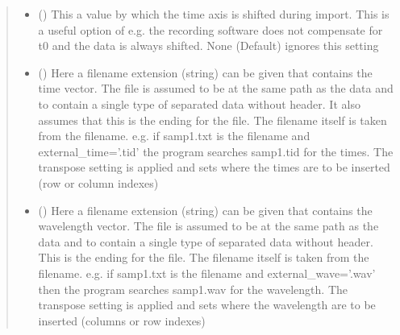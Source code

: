 \documentclass[letterpaper,10pt,english]{sphinxmanual}
\begin{document}
\begin{fulllineitems}
\begin{quote}
\begin{description}
\begin{itemize}
\item {} 
 (\sphinxstyleliteralemphasis{\sphinxupquote{, }}\sphinxstyleliteralemphasis{\sphinxupquote{ (}}\sphinxstyleliteralemphasis{\sphinxupquote{)}}) \textendash{} This a value by which the time axis is shifted during import. This is a useful option of e.g.
the recording software does not compensate for t0 and the data is always shifted.
None (Default) ignores this setting

\item {} 
 (\sphinxstyleliteralemphasis{\sphinxupquote{ (}}\sphinxstyleliteralemphasis{\sphinxupquote{)}}) \textendash{} Here a filename extension (string) can be given that contains the time vector.
The file is assumed to be at the same path as the data and to contain a single
type of separated data without header. It also assumes that this is the ending
for the file. The filename itself is taken from the filename.
e.g. if samp1.txt is the filename and external\_time=’.tid’ the program searches
samp1.tid for the times. The transpose setting is applied and sets where the times are
to be inserted (row or column indexes)

\item {} 
 (\sphinxstyleliteralemphasis{\sphinxupquote{ (}}\sphinxstyleliteralemphasis{\sphinxupquote{)}}) \textendash{} Here a filename extension (string) can be given that contains the wavelength vector.
The file is assumed to be at the same path as the data and to contain a single type
of separated data without header. This is the ending for the file. The filename itself
is taken from the filename. e.g. if samp1.txt is the filename and external\_wave=’.wav’
then the program searches samp1.wav for the wavelength. The transpose setting is applied
and sets where the wavelength are to be inserted (columns or row indexes)


\end{itemize}
\end{description}
\end{quote}
\end{fulllineitems}
\end{document}
